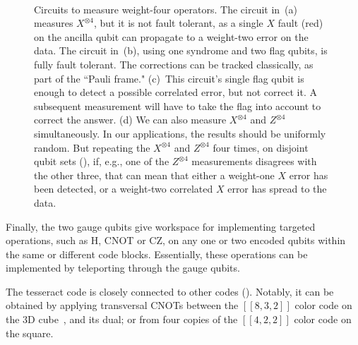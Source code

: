 \documentclass[10pt, twocolumn, aps, nofootinbib, longbibliography, nobibnotes, superscriptaddress]{revtex4-1} %
\begin{document}
\begin{figure}
$\qquad$
$\qquad$
\caption{Circuits to measure weight-four operators.
The circuit in~(a) measures $X^{\otimes 4}$, but it is not fault tolerant, as a single $X$ fault (red) on the ancilla qubit can propagate to a weight-two error on the data.  
The circuit in~(b), using one syndrome and two flag qubits, is fully fault tolerant.  The corrections can be tracked classically, as part of the ``Pauli frame."
(c)~This circuit's single flag qubit is enough to detect a possible correlated error, but not correct it.  A subsequent measurement will have to take the flag into account to correct the answer.  
(d) We can also measure $X^{\otimes 4}$ and $Z^{\otimes 4}$ simultaneously.  In our applications, the results should be uniformly random.  But repeating the $X^{\otimes 4}$ and $Z^{\otimes 4}$ four times, on disjoint qubit sets (), if, e.g., one of the $Z^{\otimes 4}$ measurements disagrees with the other three, that can mean that either a weight-one $X$ error has been detected, or a weight-two correlated $X$ error has spread to the data.}
\label{f:weight4measurements}
\end{figure}

Finally, %
the two gauge qubits give workspace for implementing targeted operations, such as H, CNOT or CZ, on any one or two encoded qubits within the same or different code blocks.  Essentially, these operations can be implemented by teleporting through the gauge qubits.  

\smallskip

The tesseract code is closely connected to other codes ().  Notably, it can be obtained by applying transversal CNOTs between the $[[8,3,2]]$ color code on the 3D cube~\cite{Campbell16eight32colorcode}, and its dual; or from four copies of the $[[4,2,2]]$ color code on the square.  
\end{document}
